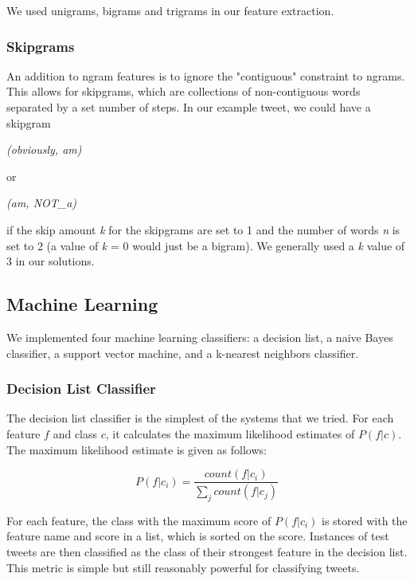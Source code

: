 \documentclass[11pt,letterpaper]{article}
\begin{document}
We used unigrams, bigrams and trigrams in our feature extraction.

\subsubsection{Skipgrams}
An addition to ngram features is to ignore the "contiguous" constraint to ngrams. This allows for skipgrams, which are collections of non-contiguous words separated by a set number of steps. In our example tweet, we could have a skipgram 

\begin{center}
\textit{(obviously, am)}
\end{center}

or

\begin{center}
\textit{(am, NOT\_a)}
\end{center}

if the skip amount \emph{k} for the skipgrams are set to 1 and the number of words \emph{n} is set to 2 (a value of \emph{k} = 0 would just be a bigram). We generally used a \emph{k} value of 3 in our solutions.

\subsection{Machine Learning}
We implemented four machine learning classifiers: a decision list, a naive Bayes classifier, a support vector machine, and a k-nearest neighbors classifier.

\subsubsection{Decision List Classifier}
The decision list classifier is the simplest of the systems that we tried. For each feature $f$ and class $c$, it calculates the maximum likelihood estimates of $P(f|c)$. The maximum likelihood estimate is given as follows:

\begin{equation}
P(f|c_i) = \frac{count(f|c_i)}{\sum_{j} count(f|c_j)}
\end{equation}

For each feature, the class with the maximum score of $P(f|c_i)$ is stored with the feature name and score in a list, which is sorted on the score. Instances of test tweets are then classified as the class of their strongest feature in the decision list. This metric is simple but still reasonably powerful for classifying tweets.
\end{document}
